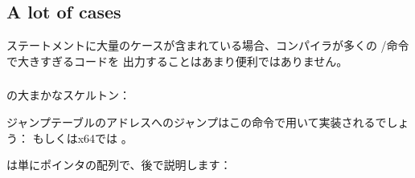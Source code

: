 ﻿\subsection{A lot of cases}

ステートメントに大量のケースが含まれている場合、コンパイラが多くの \JE/\JNE 命令で大きすぎるコードを
出力することはあまり便利ではありません。







\subsubsection{\Conclusion{}}

 の大まかなスケルトン：



ジャンプテーブルのアドレスへのジャンプはこの命令で用いて実装されるでしょう：
もしくはx64では 。

は単にポインタの配列で、後で説明します：
